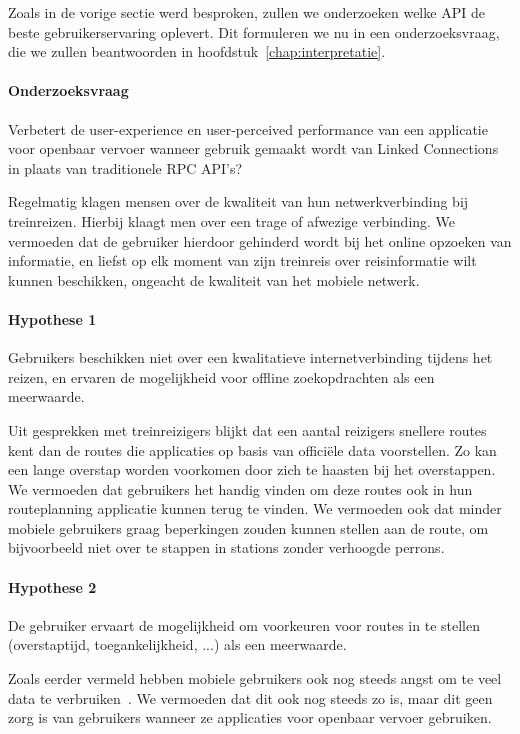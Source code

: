 Zoals in de vorige sectie werd besproken, zullen we onderzoeken welke API de beste gebruikerservaring oplevert. Dit formuleren we nu in een onderzoeksvraag, die we zullen beantwoorden in hoofdstuk~\ref{chap:interpretatie}.
 
\paragraph{Onderzoeksvraag} Verbetert de user-experience en user-perceived performance van een applicatie voor openbaar vervoer wanneer gebruik gemaakt wordt van Linked Connections in plaats van traditionele RPC API's?
 
Regelmatig klagen mensen over de kwaliteit van hun netwerkverbinding bij treinreizen. Hierbij klaagt men over een trage of afwezige verbinding. We vermoeden dat de gebruiker hierdoor gehinderd wordt bij het online opzoeken van informatie, en liefst op elk moment van zijn treinreis over reisinformatie wilt kunnen beschikken, ongeacht de kwaliteit van het mobiele netwerk.
\paragraph{Hypothese 1} Gebruikers beschikken niet over een kwalitatieve internetverbinding tijdens het reizen, en ervaren de mogelijkheid voor offline zoekopdrachten als een meerwaarde.
 
Uit gesprekken met treinreizigers blijkt dat een aantal reizigers snellere routes kent dan de routes die applicaties op basis van officiële data voorstellen. Zo kan een lange overstap worden voorkomen door zich te haasten bij het overstappen. We vermoeden dat gebruikers het handig vinden om deze routes ook in hun routeplanning applicatie kunnen terug te vinden. We vermoeden ook dat minder mobiele gebruikers graag beperkingen zouden kunnen stellen aan de route, om bijvoorbeeld niet over te stappen in stations zonder verhoogde perrons.
\paragraph{Hypothese 2} De gebruiker ervaart de mogelijkheid om voorkeuren voor routes in te stellen (overstaptijd, toegankelijkheid, ...) als een meerwaarde.
 
Zoals eerder vermeld hebben mobiele gebruikers ook nog steeds angst om te veel data te verbruiken~\citep{ammelrooy17}. We vermoeden dat dit ook nog steeds zo is, maar dit geen zorg is van gebruikers wanneer ze applicaties voor openbaar vervoer gebruiken.
